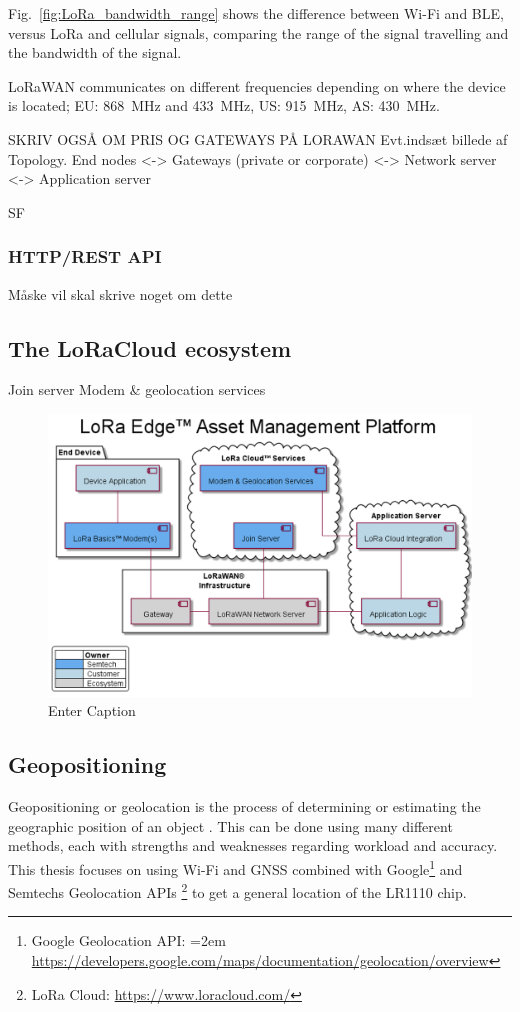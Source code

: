 Fig.~\ref{fig:LoRa_bandwidth_range} shows the difference between Wi-Fi and \ac{BLE}, versus \ac{LoRa} and cellular signals, comparing the range of the signal travelling and the bandwidth of the signal.

\ac{LoRaWAN} communicates on different frequencies depending on where the device is located; EU: \SI{868}{\mega\hertz} and \SI{433}{\mega\hertz}, US: \SI{915}{\mega\hertz}, AS: \SI{430}{\mega\hertz}.

SKRIV OGSÅ OM PRIS OG GATEWAYS PÅ LORAWAN
Evt.indsæt billede af Topology. End nodes <-> Gateways (private or corporate) <-> Network server <-> Application server

\ac{SF}

\subsubsection{HTTP/REST API}
Måske vil skal skrive noget om dette

\subsection{The LoRaCloud ecosystem}
Join server
Modem \& geolocation services

\begin{figure}
    \centering
    \includegraphics[width=0.7\linewidth]{figures/image2.png}
    \caption{Enter Caption}
\end{figure}

\subsection{Geopositioning}
Geopositioning or geolocation is the process of determining or estimating the geographic position of an object \cite{ISO19130}. This can be done using many different methods, each with strengths and weaknesses regarding workload and accuracy. This thesis focuses on using Wi-Fi and \ac{GNSS} combined with Google\footnote{Google Geolocation API: \hangindent=2em \url{https://developers.google.com/maps/documentation/geolocation/overview}} and Semtechs Geolocation APIs \footnote{LoRa Cloud: \url{https://www.loracloud.com/}} to get a general location of the LR1110 chip.

